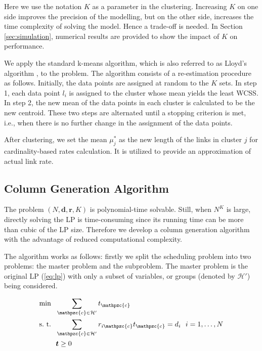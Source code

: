 \documentclass[10pt,onecolumn,journal,draftcls,oneside]{IEEEtran}
\newcommand{\CH}{\mathcal{H}}
\newcommand{\Cc}{\mathpzc{c}}
\newcommand{\Bd}{\boldsymbol{d}}
\newcommand{\Br}{\boldsymbol{r}}
\newcommand{\Bt}{\boldsymbol{t}}
\begin{document}
Here we use the notation $K$ as a parameter in the clustering. Increasing $K$ on one side improves the precision of the modelling, but on the other side, increases the time complexity of solving the model. Hence a trade-off is needed. In Section \ref{sec:simulation}, numerical results are provided to show the impact of $K$ on performance.

We apply the standard k-means algorithm, which is also referred to as Lloyd's algorithm \cite{Md03}, to the problem. The algorithm consists of a re-estimation procedure as follows. Initially, the data points are assigned at random to the $K$ sets. In step 1, each data point $l_i$ is assigned to the cluster whose mean yields the least WCSS. In step 2, the new mean of the data points in each cluster is calculated to be the new centroid. These two steps are alternated until a stopping criterion is met, i.e., when there is no further change in the assignment of the data points. 

After clustering, we set the mean $\mu_j^*$ as the new length of the links in cluster $j$ for cardinality-based rates calculation. It is utilized to provide an approximation of actual link rate.

\subsection{Column Generation Algorithm}
The problem $(N, \Bd, \Br, K)$ is polynomial-time solvable. Still, when $N^K$ is large, directly solving the LP is time-consuming since its running time can be more than cubic of the LP size. Therefore we develop a column generation algorithm with the advantage of reduced computational complexity.

The algorithm works as follows: firstly we split the scheduling problem into two problems: the master problem and the subproblem. The master problem is the original LP (\ref{eq:lp}) with only a subset of variables, or groups (denoted by $\CH'$) being considered.

\begin{subequations}
\label{eq:cg}
\begin{align}
\min~~ & \sum_{\Cc \in \CH'} t_\Cc \label{eq:cgo}\\
\text{s.~t.}~~ & \sum_{\Cc \in \CH'} r_{i\Cc} t_\Cc = d_i ~~i=1, \dots, N \label{eq:cgcons} \\
& \Bt \geq 0
\end{align}
\end{subequations}
\end{document}

